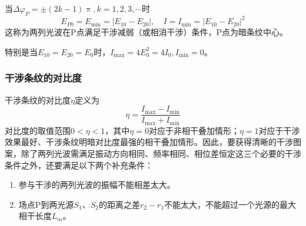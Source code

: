 \documentclass[12pt]{article}
\begin{document}
当\(\Delta \varphi_P = \pm (2k-1) \uppi, k=1,2,3,\cdots\)时
\begin{equation}
E_{P 0}=E_{\min }=\left|E_{10}-E_{20}\right|, \quad I=I_{\min }=\left|E_{10}-E_{20}\right|^2
\end{equation}
这称为两列光波在P点满足干涉减弱（或相消干涉）条件，P点为暗条纹中心。

特别是当\(E_{10} = E_{20} = E_{0}\)时，\(I_{\mathrm{max}} = 4 E_0^2 = 4 I_0, I_{\mathrm{min}} = 0\)。

\subsubsection{干涉条纹的对比度}

干涉条纹的对比度\(\eta\)定义为
\begin{equation}
    \eta = \frac{I_{\mathrm{max}} - I_{\mathrm{min}}}{I_{\mathrm{max}} + I_{\mathrm{min}}}
\end{equation}
对比度的取值范围\(0<\eta<1\)，其中\(\eta=0\)对应于非相干叠加情形；\(\eta=1\)对应于干涉效果最好、干涉条纹明暗对比度最强的相干叠加情形。因此，要获得清晰的干涉图案，除了两列光波需满足振动方向相同、频率相同、相位差恒定这三个必要的干涉 条件之外，还要满足以下两个补充条件：
\begin{enumerate}
    \item 参与干涉的两列光波的振幅不能相差太大。
    \item 场点P到两光源\(S_1\)、\(S_2\)的距离之差\(r_2 - r_1\)不能太大，不能超过一个光源的最大相干长度\(L_m\)。
\end{enumerate}
\end{document}
